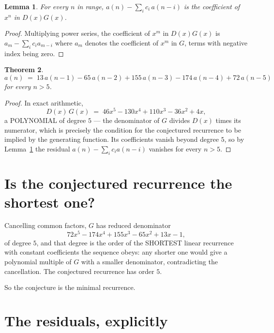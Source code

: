 \documentclass[11pt,a4paper]{article}
\theoremstyle{plain}
\newtheorem{theorem}{Theorem}
\newtheorem{lemma}[theorem]{Lemma}
\theoremstyle{definition}
\begin{document}
\begin{lemma}\label{lem:key}
For every $n$ in range, $a(n)-\sum_i c_i\,a(n-i)$ is the coefficient of $x^{n}$ in
$D(x)G(x)$.
\end{lemma}

\begin{proof}
Multiplying power series, the coefficient of $x^{m}$ in $D(x)G(x)$ is
$a_m-\sum_i c_i a_{m-i}$ where $a_m$ denotes the coefficient of $x^{m}$ in $G$, terms with
negative index being zero.
\end{proof}

\begin{theorem}
\[
a(n)\;=\;13\,a(n-1) - 65\,a(n-2) + 155\,a(n-3) - 174\,a(n-4) + 72\,a(n-5)
\]
for every $n>5$.
\end{theorem}

\begin{proof}
In exact arithmetic,
\[
D(x)\,G(x)\;=\;46 x^{5} - 130 x^{4} + 110 x^{3} - 36 x^{2} + 4 x,
\]
a POLYNOMIAL of degree $5$ --- the denominator of $G$ divides $D(x)$ times its numerator,
which is precisely the condition for the conjectured recurrence to be implied by the
generating function. Its coefficients vanish beyond degree $5$, so by
Lemma~\ref{lem:key} the residual $a(n)-\sum_ic_ia(n-i)$ vanishes for every
$n>5$.
\end{proof}

\section{Is the conjectured recurrence the shortest one?}

Cancelling common factors, $G$ has reduced denominator
\[
72 x^{5} - 174 x^{4} + 155 x^{3} - 65 x^{2} + 13 x - 1,
\]
of degree $5$, and that degree is the order of the SHORTEST linear recurrence with
constant coefficients the sequence obeys: any shorter one would give a polynomial multiple of
$G$ with a smaller denominator, contradicting the cancellation. The conjectured recurrence has
order $5$.

So the conjecture is the minimal recurrence.

\section{The residuals, explicitly}
\end{document}
